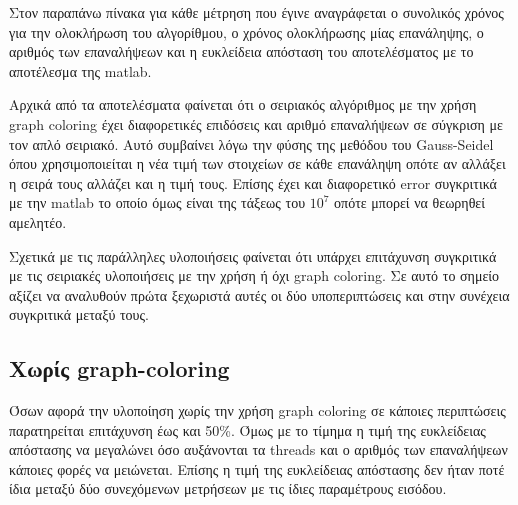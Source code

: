 \documentclass[10p]{report}
\begin{document}
\begin{table}[htbp]
{
}
\end{table}
\newpage

Στον παραπάνω πίνακα για κάθε μέτρηση που έγινε αναγράφεται ο συνολικός χρόνος
για την ολοκλήρωση του αλγορίθμου, ο χρόνος ολοκλήρωσης μίας επανάληψης, ο αριθμός 
των επαναλήψεων και η ευκλείδεια απόσταση του αποτελέσματος με το αποτέλεσμα 
της matlab. 

Αρχικά από τα αποτελέσματα φαίνεται ότι ο σειριακός αλγόριθμος με την χρήση 
graph coloring έχει διαφορετικές επιδόσεις και αριθμό επαναλήψεων σε σύγκριση με
τον απλό σειριακό. Αυτό συμβαίνει λόγω την φύσης της μεθόδου του Gauss-Seidel όπου χρησιμοποιείται 
η νέα τιμή των στοιχείων σε κάθε επανάληψη οπότε αν αλλάξει η σειρά τους αλλάζει 
και η τιμή τους. Επίσης έχει και διαφορετικό error συγκριτικά με την matlab το οποίο 
όμως είναι της τάξεως του $ 10^7 $ οπότε μπορεί να θεωρηθεί αμελητέο. 

Σχετικά με τις παράλληλες υλοποιήσεις φαίνεται ότι υπάρχει επιτάχυνση συγκριτικά 
με τις σειριακές υλοποιήσεις με την χρήση ή όχι graph coloring. Σε αυτό το σημείο 
αξίζει να αναλυθούν πρώτα ξεχωριστά αυτές οι δύο υποπεριπτώσεις και στην συνέχεια 
συγκριτικά μεταξύ τους. 

\subsection*{Χωρίς graph-coloring}

Όσων αφορά την υλοποίηση χωρίς την χρήση graph coloring σε κάποιες περιπτώσεις 
παρατηρείται επιτάχυνση έως και 50\%. Όμως με το τίμημα η τιμή της ευκλείδειας απόστασης 
να μεγαλώνει όσο αυξάνονται τα threads και ο αριθμός των επαναλήψεων κάποιες φορές 
να μειώνεται. Επίσης η τιμή της ευκλείδειας απόστασης δεν ήταν ποτέ ίδια μεταξύ δύο 
συνεχόμενων μετρήσεων με τις ίδιες παραμέτρους εισόδου. 
\end{document}
